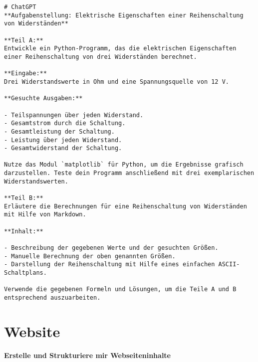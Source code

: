 \documentclass[12pt,a4paper]{scrartcl}
\begin{document}
\begin{lstlisting}
# ChatGPT
**Aufgabenstellung: Elektrische Eigenschaften einer Reihenschaltung von Widerständen**

**Teil A:** 
Entwickle ein Python-Programm, das die elektrischen Eigenschaften einer Reihenschaltung von drei Widerständen berechnet.

**Eingabe:** 
Drei Widerstandswerte in Ohm und eine Spannungsquelle von 12 V.

**Gesuchte Ausgaben:**

- Teilspannungen über jeden Widerstand.
- Gesamtstrom durch die Schaltung.
- Gesamtleistung der Schaltung.
- Leistung über jeden Widerstand.
- Gesamtwiderstand der Schaltung.

Nutze das Modul `matplotlib` für Python, um die Ergebnisse grafisch darzustellen. Teste dein Programm anschließend mit drei exemplarischen Widerstandswerten.

**Teil B:** 
Erläutere die Berechnungen für eine Reihenschaltung von Widerständen mit Hilfe von Markdown.

**Inhalt:**

- Beschreibung der gegebenen Werte und der gesuchten Größen.
- Manuelle Berechnung der oben genannten Größen.
- Darstellung der Reihenschaltung mit Hilfe eines einfachen ASCII-Schaltplans.

Verwende die gegebenen Formeln und Lösungen, um die Teile A und B entsprechend auszuarbeiten.
\end{lstlisting}

\hypertarget{website}{%
\section{Website}\label{website}}

\textbf{Erstelle und Strukturiere mir Webseiteninhalte}
\end{document}
